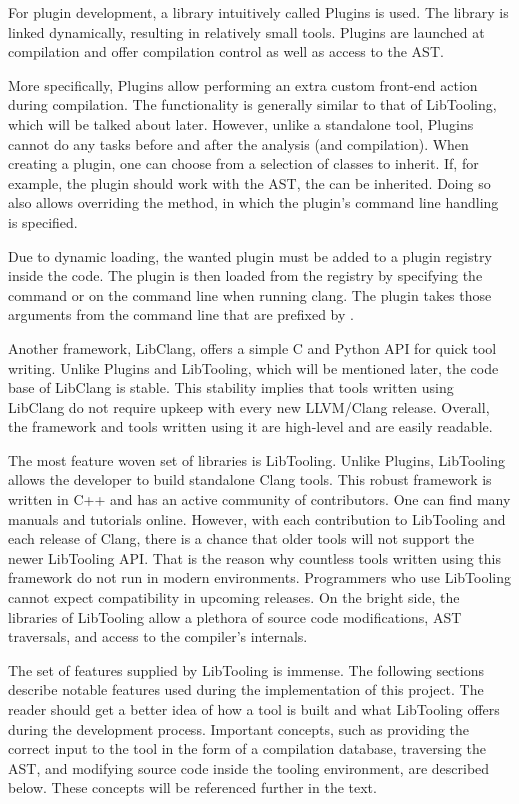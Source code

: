 For plugin development, a library intuitively called Plugins is used.
The library is linked dynamically, resulting in relatively small tools.
Plugins are launched at compilation and offer compilation control as well 
as access to the AST.

More specifically, Plugins allow performing an extra custom front-end action 
during compilation.
The functionality is generally similar to that of LibTooling, which will be 
talked about later.
However, unlike a standalone tool, Plugins cannot do any tasks before and after 
the analysis (and compilation).
When creating a plugin, one can choose from a selection of 
 classes to inherit.
If, for example, the plugin should work with the AST, 
the  can be inherited.
Doing so also allows overriding the  method, in which 
the plugin's command line handling is specified.

Due to dynamic loading, the wanted plugin must be added to a plugin registry 
inside the code.
The plugin is then loaded from the registry by specifying the  
command or  on the command line when running clang.
The plugin takes those arguments from the command line that are prefixed 
by .

Another framework, LibClang, offers a simple C and Python API for quick 
tool writing. 
Unlike Plugins and LibTooling, which will be mentioned later, the code 
base of LibClang is stable. 
This stability implies that tools written using LibClang do not require
upkeep with every new LLVM/Clang release. 
Overall, the framework and tools written using it are high-level and 
are easily readable.

The most feature woven set of libraries is LibTooling. 
Unlike Plugins, LibTooling allows the developer to build standalone 
Clang tools. 
This robust framework is written in C++ and has an active 
community of contributors. 
One can find many manuals and tutorials online. 
However, with each contribution to LibTooling and each release of Clang, 
there is a chance that older tools will not support the newer LibTooling 
API. 
That is the reason why countless tools written using this framework do not
run in modern environments. 
Programmers who use LibTooling cannot expect compatibility in upcoming 
releases. 
On the bright side, the libraries of LibTooling allow a plethora of source
code modifications, AST traversals, and access to the compiler's internals.

The set of features supplied by LibTooling is immense. 
The following sections describe notable features used during 
the implementation of this project. 
The reader should get a better idea of how a tool is built and what 
LibTooling offers during the development process. 
Important concepts, such as providing the correct input to the tool 
in the form of a compilation database, traversing the AST, 
and modifying source code inside the tooling environment, 
are described below. 
These concepts will be referenced further in the text.


